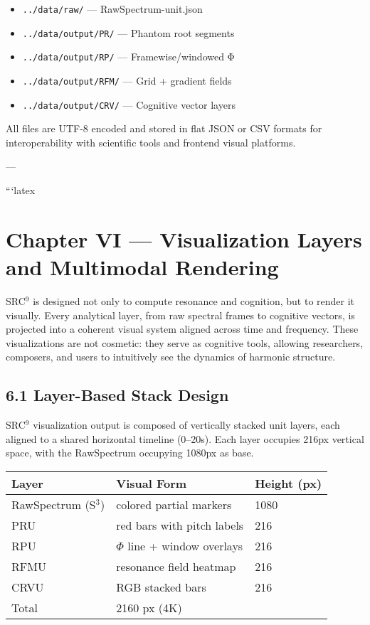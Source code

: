 \documentclass[10pt]{article}
\begin{document}
\begin{itemize}
    \item \texttt{../data/raw/} — RawSpectrum-unit.json
    \item \texttt{../data/output/PR/} — Phantom root segments
    \item \texttt{../data/output/RP/} — Framewise/windowed Φ
    \item \texttt{../data/output/RFM/} — Grid + gradient fields
    \item \texttt{../data/output/CRV/} — Cognitive vector layers
\end{itemize}

All files are UTF-8 encoded and stored in flat JSON or CSV formats for interoperability with scientific tools and frontend visual platforms.


---

```latex
\section*{Chapter VI — Visualization Layers and Multimodal Rendering}

SRC$^{9}$ is designed not only to compute resonance and cognition, but to render it visually. Every analytical layer, from raw spectral frames to cognitive vectors, is projected into a coherent visual system aligned across time and frequency. These visualizations are not cosmetic: they serve as cognitive tools, allowing researchers, composers, and users to intuitively see the dynamics of harmonic structure.

\subsection*{6.1 Layer-Based Stack Design}

SRC$^{9}$ visualization output is composed of vertically stacked unit layers, each aligned to a shared horizontal timeline (0–20s). Each layer occupies 216px vertical space, with the RawSpectrum occupying 1080px as base.

\begin{center}
\begin{tabular}{|l|l|l|}
\hline
\textbf{Layer} & \textbf{Visual Form} & \textbf{Height (px)} \\
\hline
RawSpectrum (S$^3$) & colored partial markers & 1080 \\
PRU & red bars with pitch labels & 216 \\
RPU & $\Phi$ line + window overlays & 216 \\
RFMU & resonance field heatmap & 216 \\
CRVU & RGB stacked bars & 216 \\
\hline
Total & 2160 px (4K) & \\
\hline
\end{tabular}
\end{center}
\end{document}
